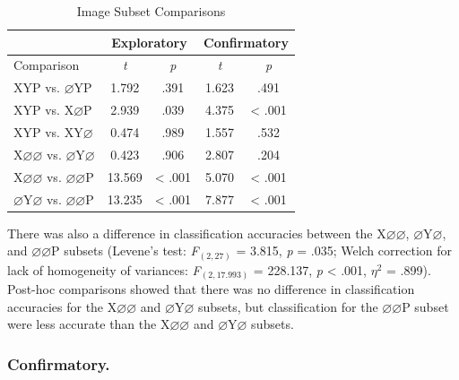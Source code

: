 \documentclass[
  english,
  man,floatsintext]{apa6}
\begin{document}
\begin{table}[!h]
    \centering
    \caption{Image Subset Comparisons}
    \label{tab:image-parcellation-comparisons}
    \begin{tabular}{l c c c c}
         & \multicolumn{2}{c}{Exploratory} & \multicolumn{2}{c}{Confirmatory} \\
        \hline
        Comparison & \textit{t} & \multicolumn{1}{c|}{\textit{p}} & \textit{t} & \textit{p} \\
        \hline
        XYP vs. $\varnothing$YP & 1.792 & \multicolumn{1}{c|}{.391} & 1.623 & .491 \\
        XYP vs. X$\varnothing$P & 2.939 & \multicolumn{1}{c|}{.039} & 4.375 & < .001 \\
        XYP vs. XY$\varnothing$ & 0.474 & \multicolumn{1}{c|}{.989} & 1.557 & .532 \\
        X$\varnothing\varnothing$ vs. $\varnothing$Y$\varnothing$ & 0.423 & \multicolumn{1}{c|}{.906} & 2.807 & .204 \\
        X$\varnothing\varnothing$ vs. $\varnothing\varnothing$P & 13.569 & \multicolumn{1}{c|}{< .001} & 5.070 & < .001 \\
        $\varnothing$Y$\varnothing$ vs. $\varnothing\varnothing$P & 13.235 & \multicolumn{1}{c|}{< .001} & 7.877 & < .001 \\
        \hline
    \end{tabular}
\end{table}

There was also a difference in classification accuracies between the X\(\varnothing\varnothing\), \(\varnothing\)Y\(\varnothing\), and \(\varnothing\varnothing\)P subsets (Levene's test: \emph{F}\(_{(2, 27)}\) = 3.815, \emph{p} = .035; Welch correction for lack of homogeneity of variances: \emph{F}\(_{(2, 17.993)}\) = 228.137, \emph{p} \textless{} .001, \textit{$\eta$}\(^{2}\) = .899). Post-hoc comparisons showed that there was no difference in classification accuracies for the X\(\varnothing\varnothing\) and \(\varnothing\)Y\(\varnothing\) subsets, but classification for the \(\varnothing\varnothing\)P subset were less accurate than the X\(\varnothing\varnothing\) and \(\varnothing\)Y\(\varnothing\) subsets.

\subsubsection{Confirmatory.}
\end{document}
